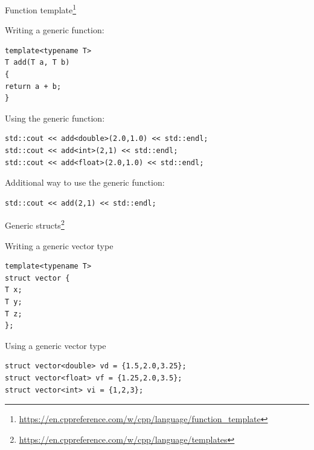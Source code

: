 \documentclass[\classoption]{beamer}
\begin{document}
\begin{frame}[fragile]{Function template\footnote{\tiny\url{https://en.cppreference.com/w/cpp/language/function_template}}}

\begin{block}{Writing a generic function:}
\begin{lstlisting}
template<typename T>
T add(T a, T b)
{
return a + b;
}
\end{lstlisting}
\end{block}

\begin{block}{Using the generic function:}
\begin{lstlisting}
std::cout << add<double>(2.0,1.0) << std::endl;
std::cout << add<int>(2,1) << std::endl;
std::cout << add<float>(2.0,1.0) << std::endl;
\end{lstlisting}
\end{block}

\begin{block}{Additional way to use the generic function:}
\begin{lstlisting}
std::cout << add(2,1) << std::endl;
\end{lstlisting}
\end{block}

\end{frame}


\begin{frame}[fragile]{Generic structs\footnote{\tiny\url{https://en.cppreference.com/w/cpp/language/templates}}}

\begin{block}{Writing a generic vector type}
\begin{lstlisting}
template<typename T>
struct vector {
T x;
T y;
T z;
};
\end{lstlisting}
\end{block}

\begin{block}{Using a generic vector type}
\begin{lstlisting}
struct vector<double> vd = {1.5,2.0,3.25};
struct vector<float> vf = {1.25,2.0,3.5};
struct vector<int> vi = {1,2,3};
\end{lstlisting}
\end{block}
\end{frame}
\end{document}
